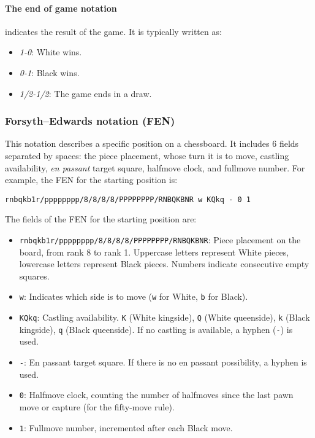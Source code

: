 \paragraph{The end of game notation} indicates the result of the game. It is typically written as:

\begin{itemize}[itemsep=1pt]
    \item \textit{1-0}: White wins.
    \item \textit{0-1}: Black wins.
    \item \textit{1/2-1/2}: The game ends in a draw.
\end{itemize}

\subsubsection*{Forsyth–Edwards notation (FEN)}

This notation describes a specific position on a chessboard. It includes 6 fields separated by spaces: the piece placement, whose turn it is to move, castling availability, \textit{en passant} target square, halfmove clock, and fullmove number.
For example, the FEN for the starting position is:
\begin{verbatim}
rnbqkb1r/pppppppp/8/8/8/8/PPPPPPPP/RNBQKBNR w KQkq - 0 1
\end{verbatim}

\noindent The fields of the FEN for the starting position are:

\begin{itemize}[itemsep=1pt]
    \item \texttt{rnbqkb1r/pppppppp/8/8/8/8/PPPPPPPP/RNBQKBNR}: Piece placement on the board, from rank 8 to rank 1. Uppercase letters represent White pieces, lowercase letters represent Black pieces. Numbers indicate consecutive empty squares.
    \item \texttt{w}: Indicates which side is to move (\texttt{w} for White, \texttt{b} for Black).
    \item \texttt{KQkq}: Castling availability. \texttt{K} (White kingside), \texttt{Q} (White queenside), \texttt{k} (Black kingside), \texttt{q} (Black queenside). If no castling is available, a hyphen (\texttt{-}) is used.
    \item \texttt{-}: En passant target square. If there is no en passant possibility, a hyphen is used.
    \item \texttt{0}: Halfmove clock, counting the number of halfmoves since the last pawn move or capture (for the fifty-move rule).
    \item \texttt{1}: Fullmove number, incremented after each Black move.
\end{itemize}

